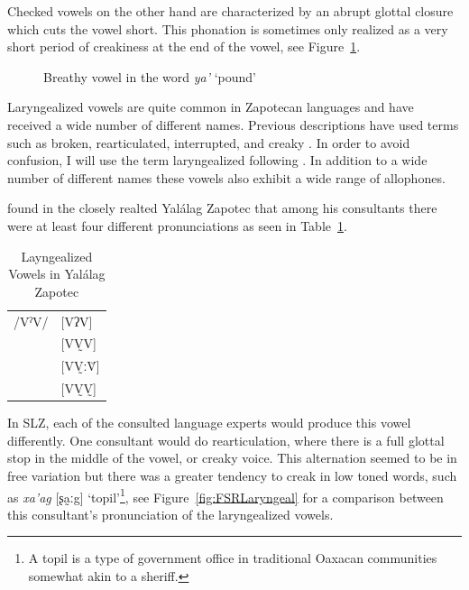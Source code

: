 \documentclass[12pt, letterpaper]{article}
\providecommand{\lsptoprule}{\midrule\toprule}
\providecommand{\lspbottomrule}{\bottomrule\midrule}
\begin{document}
Checked vowels on the other hand are characterized by an abrupt glottal closure which cuts the vowel short. This phonation is sometimes only realized as a very short period of creakiness at the end of the vowel, see Figure~\ref{fig:CheckedVowel}.  

\begin{figure}[!h]
	\caption{Breathy vowel in the word \textit{ya'} `pound'}
	\label{fig:CheckedVowel}
\end{figure}

Laryngealized vowels are quite common in Zapotecan languages and have received a wide number of different names. Previous descriptions have used terms such as broken, rearticulated, interrupted, and creaky \citep{longDiccionarioZapotecoSan2005,avelinobecerraTopicsYalalagZapotec2004,avelinoAcousticElectroglottographicAnalyses2010,sonnenscheinDescriptiveGrammarSan2005,adlerAcousticsPhonationTypes2016}. In order to avoid confusion, I will use the term laryngealized following \citet{avelinoAcousticElectroglottographicAnalyses2010}. In addition to a wide number of different names these vowels also exhibit a wide range of allophones. 

\citet{avelinoAcousticElectroglottographicAnalyses2010} found in the closely realted Yalálag Zapotec that among his consultants there were at least four different pronunciations as seen in Table~\ref{tab:laryngeal}. 
\begin{table}[!h]
	\centering
	\caption{Layngealized Vowels in Yalálag Zapotec}
	\label{tab:laryngeal}
	 \begin{tabular}{ll}
	\lsptoprule
	/VˀV/	&  [VʔV]  \\
			&  [VV̰V]   \\
			&  [VV̰ːV̆]  \\
			&  [VV̰V̰]	\\
	\lspbottomrule
	\end{tabular}
\end{table}
In SLZ, each of the consulted language experts would produce this vowel differently. One consultant would do rearticulation, where there is a full glottal stop in the middle of the vowel, or creaky voice. This alternation seemed to be in free variation but there was a greater tendency to creak in low toned words, such as \textit{xa'ag} [ʂa̰ːg] `topil'\footnote{A topil is a type of government office in traditional Oaxacan communities somewhat akin to a sheriff. }, see Figure~\ref{fig:FSRLaryngeal} for a comparison between this consultant's pronunciation of the laryngealized vowels.
\end{document}
